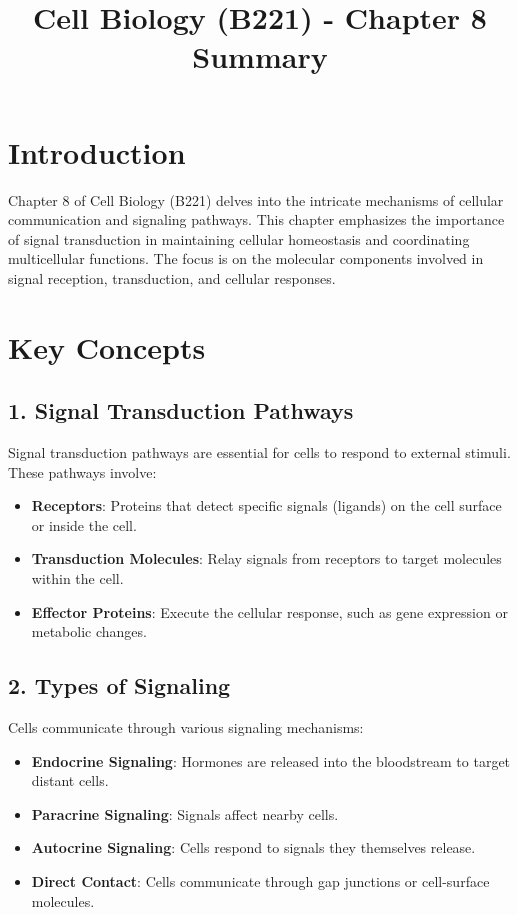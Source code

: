 \documentclass[12pt]{article}
\title{Cell Biology (B221) - Chapter 8 Summary}
\author{}
\date{}
\begin{document}
\maketitle

\doublespacing

\section*{Introduction}
Chapter 8 of Cell Biology (B221) delves into the intricate mechanisms of cellular communication and signaling pathways. This chapter emphasizes the importance of signal transduction in maintaining cellular homeostasis and coordinating multicellular functions. The focus is on the molecular components involved in signal reception, transduction, and cellular responses.

\section*{Key Concepts}

\subsection*{1. Signal Transduction Pathways}
Signal transduction pathways are essential for cells to respond to external stimuli. These pathways involve:
\begin{itemize}
    \item \textbf{Receptors}: Proteins that detect specific signals (ligands) on the cell surface or inside the cell.
    \item \textbf{Transduction Molecules}: Relay signals from receptors to target molecules within the cell.
    \item \textbf{Effector Proteins}: Execute the cellular response, such as gene expression or metabolic changes.
\end{itemize}

\subsection*{2. Types of Signaling}
Cells communicate through various signaling mechanisms:
\begin{itemize}
    \item \textbf{Endocrine Signaling}: Hormones are released into the bloodstream to target distant cells.
    \item \textbf{Paracrine Signaling}: Signals affect nearby cells.
    \item \textbf{Autocrine Signaling}: Cells respond to signals they themselves release.
    \item \textbf{Direct Contact}: Cells communicate through gap junctions or cell-surface molecules.
\end{itemize}
\end{document}
